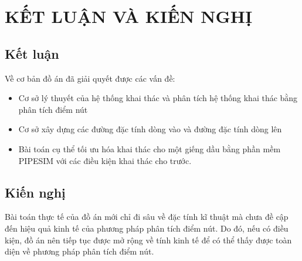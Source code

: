 \documentclass[12pt,a4paper]{report}
\begin{document}
\chapter*{\hspace*{4.4cm}KẾT LUẬN VÀ KIẾN NGHỊ}
\section*{Kết luận}
Về cơ bản đồ án đã giải quyết được các vấn đề:
	\begin{itemize}
		\item Cơ sở lý thuyết của hệ thống khai thác và phân tích hệ thống khai thác bằng phân tích điểm nút
		\item Cơ sở xây dựng các đường đặc tính dòng vào và đường đặc tính dòng lên
		\item Bài toán cụ thể tối ưu hóa khai thác cho một giếng dầu bằng phần mềm PIPESIM với các điều kiện khai thác cho trước.
	\end{itemize}
\section*{Kiến nghị}
Bài toán thực tế của đồ án mới chỉ đi sâu về đặc tính kĩ thuật mà chưa đề cập đến hiệu quả kinh tế của phương pháp phân tích điểm nút. Do đó, nếu có điều kiện, đồ án nên tiếp tục được mở rộng về tính kinh tế để có thể thấy được toàn diện về phương pháp phân tích điểm nút.



\end{document}
